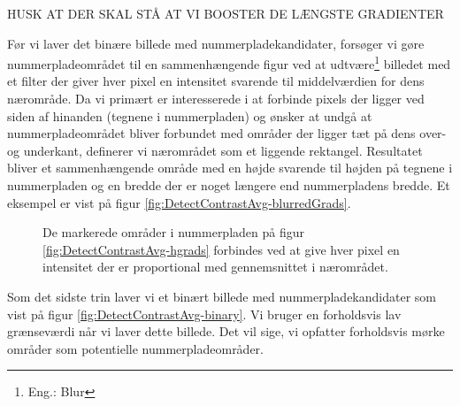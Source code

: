 HUSK AT DER SKAL STÅ AT VI BOOSTER DE LÆNGSTE GRADIENTER


Før vi laver det binære billede med nummerpladekandidater, forsøger vi gøre nummerpladeområdet til en sammenhængende figur ved at udtvære\footnote{Eng.: Blur} billedet med et filter der giver hver pixel en intensitet svarende til middelværdien for dens nærområde. Da vi primært er interesserede i at forbinde pixels der ligger ved siden af hinanden (tegnene i nummerpladen) og ønsker at undgå at nummerpladeområdet bliver forbundet med områder der ligger tæt på dens over- og underkant, definerer vi nærområdet som et liggende rektangel. Resultatet bliver et sammenhængende område med en højde svarende til højden på tegnene i nummerpladen og en bredde der er noget længere end nummerpladens bredde. Et eksempel er vist på figur \vref{fig:DetectContrastAvg-blurredGrads}. 

\begin{figure}[htp]
  \centering
  \caption{De markerede områder i nummerpladen på figur \vref{fig:DetectContrastAvg-hgrads} forbindes ved at give hver pixel en intensitet der er proportional med gennemsnittet i nærområdet.}
  \label{fig:DetectContrastAvg-blurredGrads}  
\end{figure}


Som det sidste trin laver vi et binært billede med nummerpladekandidater som vist på figur \vref{fig:DetectContrastAvg-binary}. Vi bruger en forholdsvis lav grænseværdi når vi laver dette billede. Det vil sige, vi opfatter forholdsvis mørke områder som potentielle nummerpladeområder.

